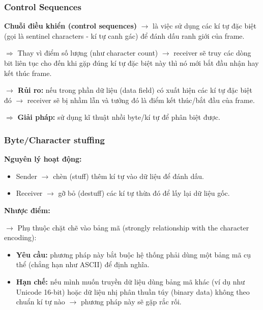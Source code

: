 \subsubsection{Control Sequences}

\noindent
\textbf{Chuỗi điều khiển (control sequences)} $\rightarrow$ là việc sử dụng các kí tự đặc biệt (gọi là sentinel characters - kí tự canh gác) để đánh dấu ranh giới của frame.

$\Rightarrow$ Thay vì điểm số lượng (như character count) $\rightarrow$ receiver sẽ truy các dòng bit liên tục cho đến khi gặp đúng kí tự đặc biệt này thì nó mới bắt đầu nhận hay kết thúc frame.
\medskip

\textbf{$\rightarrow$ Rủi ro:} nếu trong phần dữ liệu (data field) có xuất hiện các kí tự đặc biệt đó $\rightarrow$ receiver sẽ bị nhầm lẫn và tưởng đó là điểm kết thúc/bắt đầu của frame.
\medskip

\noindent
$\Rightarrow$ \textbf{Giải pháp:} sử dụng kĩ thuật nhồi byte/kí tự để phân biệt được.
\medskip

\subsubsection{Byte/Character stuffing}

\noindent
\textbf{Nguyên lý hoạt động:}

\begin{itemize}
    \item Sender $\rightarrow$ chèn (stuff) thêm kí tự vào dữ liệu để đánh dấu.
    \item Receiver $\rightarrow$ gỡ bỏ (destuff) các kí tự thừa đó để lấy lại dữ liệu gốc.
\end{itemize}
\medskip

\noindent
\textbf{Nhược điểm:}
\medskip

\noindent
$\rightarrow$ Phụ thuộc chặt chẽ vào bảng mã (strongly relationship with the character encoding):

\begin{itemize}
    \item \textbf{Yêu cầu:} phương pháp này bắt buộc hệ thống phải dùng một bảng mã cụ thể (chẳng hạn như ASCII) để định nghĩa.
    \item \textbf{Hạn chế:} nếu mình muốn truyền dữ liệu dùng bảng mã khác (ví dụ như Unicode 16-bit) hoặc dữ liệu nhị phân thuần túy (binary data) không theo chuẩn kí tự nào $\rightarrow$ phương pháp này sẽ gặp rắc rối.
\end{itemize}
\medskip

